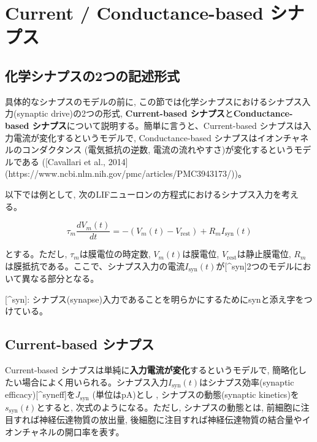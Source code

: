 \section{Current / Conductance-based シナプス
}


\subsection{化学シナプスの2つの記述形式
}


具体的なシナプスのモデルの前に, この節では化学シナプスにおけるシナプス入力(synaptic drive)の2つの形式, \textbf{Current-based シナプス}と\textbf{Conductance-based シナプス}について説明する。簡単に言うと、Current-based シナプスは入力電流が変化するというモデルで, Conductance-based シナプスはイオンチャネルのコンダクタンス (電気抵抗の逆数, 電流の流れやすさ)が変化するというモデルである ([Cavallari et al., 2014](https://www.ncbi.nlm.nih.gov/pmc/articles/PMC3943173/))。



以下では例として, 次のLIFニューロンの方程式におけるシナプス入力を考える。



\begin{equation}

\tau_m \frac{dV_{m}(t)}{dt}=-(V_{m}(t)-V_\text{rest})+R_m I_{\text{syn}}(t)    

\end{equation}



とする。ただし, $\tau_m$は膜電位の時定数, $V_m(t)$は膜電位, $V_\text{rest}$は静止膜電位, $R_m$は膜抵抗である。ここで、シナプス入力の電流$I_{\text{syn}}(t)$が[^syn]2つのモデルにおいて異なる部分となる。



[^syn]: シナプス(synapse)入力であることを明らかにするためにsynと添え字をつけている。



\subsection{Current-based シナプス
}
Current-based シナプスは単純に\textbf{入力電流が変化}するというモデルで, 簡略化したい場合によく用いられる。シナプス入力$I_{\text{syn}}(t)$はシナプス効率(synaptic efficacy)[^syneff]を$J_{\text{syn}}$ (単位はpA)とし , シナプスの動態(synaptic kinetics)を$s_{\text{syn}}(t)$とすると, 次式のようになる。ただし, シナプスの動態とは, 前細胞に注目すれば神経伝達物質の放出量, 後細胞に注目すれば神経伝達物質の結合量やイオンチャネルの開口率を表す。





